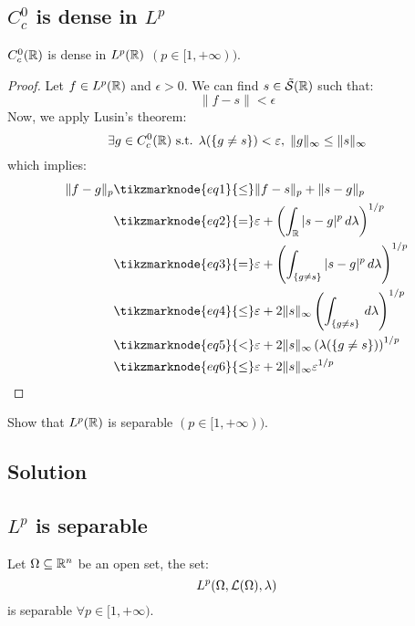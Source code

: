 \subsection{\texorpdfstring{$C^0_c$}{The set of continuous functions with compact support} is dense in \texorpdfstring{$L^p$}{Lp}}
$C^0_c(\mathbb{R})$ is dense in $L^p(\mathbb{R})$ $(p \in [1, +\infty))$.

\begin{proof}
    Let $f\in L^p(\mathbb{R})$ and $\epsilon>0$. We can find $s\in\tilde{\mathcal{S}}(\mathbb{R})$ such that:
    \[ \|f-s\| < \epsilon \]
    Now, we apply Lusin's theorem:
    \[ \exists g \in C^0_c(\mathbb{R}) \text{ s.t. } \lambda(\{ g\neq s\}) < \varepsilon, \; \|g\|_\infty \leq \|s\|_\infty\]
    which implies:
    \begin{align*}
        \|f-g\|_p & \tikzmarknode{eq1}{\leq} \|f-s\|_p + \|s-g\|_p \\
        & \tikzmarknode{eq2}{=} \epsilon + \left( \int_\R |s-g|^p \, d\lambda \right)^{1/p} \\
        & \tikzmarknode{eq3}{=} \epsilon + \left( \int_{ \{g\neq s\} } |s-g|^p \, d\lambda \right)^{1/p} \\
        & \tikzmarknode{eq4}{\leq} \epsilon + 2 \|s\|_\infty \left( \int_{\{g\neq s\}} \, d\lambda \right)^{1/p} \\
        & \tikzmarknode{eq5}{<} \epsilon + 2 \|s\|_\infty \left( \lambda(\{ g\neq s\}) \right)^{1/p} \\
        & \tikzmarknode{eq6}{\leq} \epsilon + 2 \|s\|_\infty \epsilon^{1/p}
    \end{align*}
\end{proof}


\question
Show that $L^p(\mathbb{R})$ is separable $(p \in [1, +\infty))$.

\subsection*{Solution}

\subsection{\texorpdfstring{$L^p$}{Lp} is separable}
Let $\Omega \subseteq \mathbb{R}^n$ be an open set, the set:
\[ L^p(\Omega, \mathcal{L}(\Omega), \lambda)\]
is separable $\forall p \in [1,+\infty)$.

